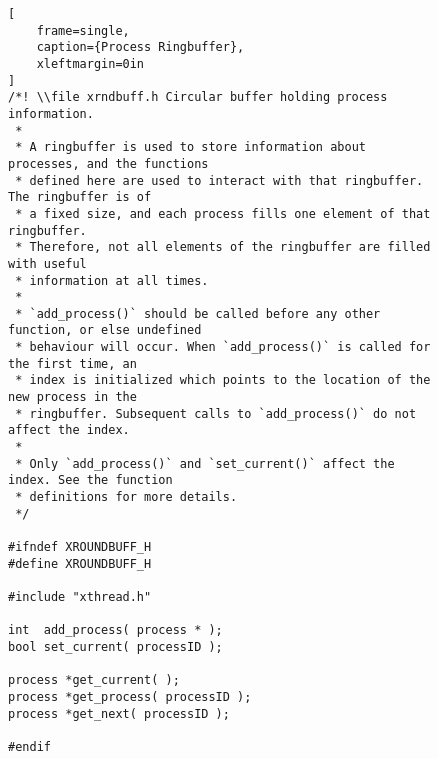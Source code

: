 \documentclass{article}
\begin{document}
\begin{figure}[tbhp] %
\label{fig:xrndbuff.h}
\begin{lstlisting}[
    frame=single,
    caption={Process Ringbuffer},
    xleftmargin=0in
]
/*! \\file xrndbuff.h Circular buffer holding process information.
 *
 * A ringbuffer is used to store information about processes, and the functions
 * defined here are used to interact with that ringbuffer. The ringbuffer is of
 * a fixed size, and each process fills one element of that ringbuffer.
 * Therefore, not all elements of the ringbuffer are filled with useful
 * information at all times.
 *
 * `add_process()` should be called before any other function, or else undefined
 * behaviour will occur. When `add_process()` is called for the first time, an
 * index is initialized which points to the location of the new process in the
 * ringbuffer. Subsequent calls to `add_process()` do not affect the index.
 *
 * Only `add_process()` and `set_current()` affect the index. See the function
 * definitions for more details.
 */

#ifndef XROUNDBUFF_H
#define XROUNDBUFF_H

#include "xthread.h"

int  add_process( process * );
bool set_current( processID );

process *get_current( );
process *get_process( processID );
process *get_next( processID );

#endif
\end{lstlisting}
\end{figure}
\end{document}
